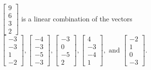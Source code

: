 \begin{exercise}
\begin{exerciseStatement}
  \end{exerciseStatement}
  \begin{exerciseAnswer}
   \(\left[\begin{array}{c}
9 \\
6 \\
3 \\
2
\end{array}\right]\) 
  	 is  
	a linear combination of the vectors \(\left[\begin{array}{c}
-3 \\
-3 \\
1 \\
-2
\end{array}\right] , \left[\begin{array}{c}
-4 \\
-3 \\
-5 \\
-3
\end{array}\right] , \left[\begin{array}{c}
-3 \\
0 \\
-5 \\
2
\end{array}\right] , \left[\begin{array}{c}
4 \\
-3 \\
-4 \\
1
\end{array}\right] , \text{ and } \left[\begin{array}{c}
-2 \\
1 \\
0 \\
-3
\end{array}\right]\).

	
  


  \end{exerciseAnswer}
\end{exercise}